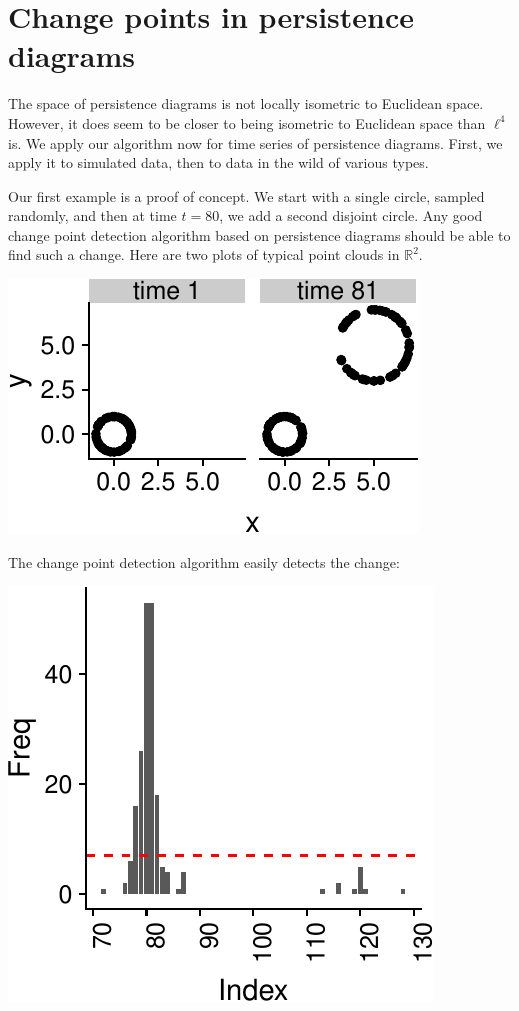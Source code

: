 \documentclass[smallextended]{svjour3}       %
\begin{document}
\section{Change points in persistence diagrams}\label{sec:2}

The space of persistence diagrams is not locally isometric to Euclidean
space. However, it does seem to be closer to being isometric to
Euclidean space than \(\ell^4\) is. We apply our algorithm now for time
series of persistence diagrams. First, we apply it to simulated data,
then to data in the wild of various types.

Our first example is a proof of concept. We start with a single circle,
sampled randomly, and then at time \(t = 80\), we add a second disjoint
circle. Any good change point detection algorithm based on persistence
diagrams should be able to find such a change. Here are two plots of
typical point clouds in \(\mathbb{R}^2\).

\begin{center}\includegraphics{springer_template_files/figure-latex/chunk_6-1} \end{center}

The change point detection algorithm easily detects the change:

\begin{center}\includegraphics{springer_template_files/figure-latex/unnamed-chunk-1-1} \end{center}
\end{document}
